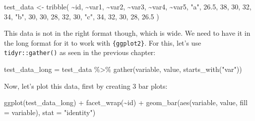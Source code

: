 \documentclass[
]{article}
\newenvironment{Shaded}{\begin{snugshade}}{\end{snugshade}}
\newcommand{\AttributeTok}[1]{\textcolor[rgb]{0.77,0.63,0.00}{#1}}
\newcommand{\DecValTok}[1]{\textcolor[rgb]{0.00,0.00,0.81}{#1}}
\newcommand{\FloatTok}[1]{\textcolor[rgb]{0.00,0.00,0.81}{#1}}
\newcommand{\FunctionTok}[1]{\textcolor[rgb]{0.00,0.00,0.00}{#1}}
\newcommand{\NormalTok}[1]{#1}
\newcommand{\OtherTok}[1]{\textcolor[rgb]{0.56,0.35,0.01}{#1}}
\newcommand{\SpecialCharTok}[1]{\textcolor[rgb]{0.00,0.00,0.00}{#1}}
\newcommand{\StringTok}[1]{\textcolor[rgb]{0.31,0.60,0.02}{#1}}
\begin{document}
\begin{Shaded}
\begin{Highlighting}[]
\NormalTok{test\_data }\OtherTok{\textless{}{-}} \FunctionTok{tribble}\NormalTok{(}
  \SpecialCharTok{\textasciitilde{}}\NormalTok{id, }\SpecialCharTok{\textasciitilde{}}\NormalTok{var1, }\SpecialCharTok{\textasciitilde{}}\NormalTok{var2,  }\SpecialCharTok{\textasciitilde{}}\NormalTok{var3, }\SpecialCharTok{\textasciitilde{}}\NormalTok{var4, }\SpecialCharTok{\textasciitilde{}}\NormalTok{var5,}
  \StringTok{"a"}\NormalTok{, }\FloatTok{26.5}\NormalTok{, }\DecValTok{38}\NormalTok{, }\DecValTok{30}\NormalTok{, }\DecValTok{32}\NormalTok{, }\DecValTok{34}\NormalTok{,}
  \StringTok{"b"}\NormalTok{, }\DecValTok{30}\NormalTok{, }\DecValTok{30}\NormalTok{, }\DecValTok{28}\NormalTok{, }\DecValTok{32}\NormalTok{, }\DecValTok{30}\NormalTok{,}
  \StringTok{"c"}\NormalTok{, }\DecValTok{34}\NormalTok{, }\DecValTok{32}\NormalTok{, }\DecValTok{30}\NormalTok{, }\DecValTok{28}\NormalTok{, }\FloatTok{26.5}
\NormalTok{)}
\end{Highlighting}
\end{Shaded}

This data is not in the right format though, which is wide. We need to have it in the long format
for it to work with \texttt{\{ggplot2\}}. For this, let's use \texttt{tidyr::gather()} as seen in the previous chapter:

\begin{Shaded}
\begin{Highlighting}[]
\NormalTok{test\_data\_long }\OtherTok{=}\NormalTok{ test\_data }\SpecialCharTok{\%\textgreater{}\%}
  \FunctionTok{gather}\NormalTok{(variable, value, }\FunctionTok{starts\_with}\NormalTok{(}\StringTok{"var"}\NormalTok{))}
\end{Highlighting}
\end{Shaded}

Now, let's plot this data, first by creating 3 bar plots:

\begin{Shaded}
\begin{Highlighting}[]
\FunctionTok{ggplot}\NormalTok{(test\_data\_long) }\SpecialCharTok{+}
  \FunctionTok{facet\_wrap}\NormalTok{(}\SpecialCharTok{\textasciitilde{}}\NormalTok{id) }\SpecialCharTok{+}
  \FunctionTok{geom\_bar}\NormalTok{(}\FunctionTok{aes}\NormalTok{(variable, value, }\AttributeTok{fill =}\NormalTok{ variable), }\AttributeTok{stat =} \StringTok{"identity"}\NormalTok{)}
\end{Highlighting}
\end{Shaded}
\end{document}
